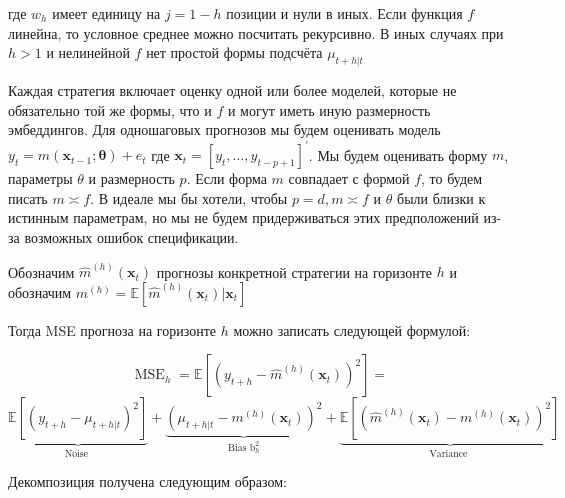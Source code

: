 \documentclass[a4paper,12pt]{article}
\begin{document}
где $ w_h $ имеет единицу на $ j = 1 - h $ позиции и нули в иных. Если функция $ f $ линейна, то условное среднее можно посчитать рекурсивно. В иных случаях при $ h > 1 $ и нелинейной $ f $ нет простой формы подсчёта $ \mu_{t+h | t} $

Каждая стратегия включает оценку одной или более моделей, которые не обязательно той же формы, что и $ f $ и могут иметь иную размерность эмбеддингов. Для одношаговых прогнозов мы будем оценивать модель $y_{t}=m\left(\boldsymbol{x}_{t-1} ; \boldsymbol{\theta}\right)+e_{t}$ где $\boldsymbol{x}_{t}=\left[y_{t}, \ldots, y_{t-p+1}\right]^{\prime}$. Мы будем оценивать форму $ m $, параметры $ \theta $ и размерность $ p $. Если форма $ m $  совпадает с формой $ f $, то будем писать $ m \asymp f $. В идеале мы бы хотели, чтобы $p=d, m \asymp f$ и $ \theta $ были близки к истинным параметрам, но мы не будем придерживаться этих предположений из-за возможных ошибок спецификации. 

Обозначим $\hat{m}^{(h)}\left(\boldsymbol{x}_{t}\right)$ прогнозы конкретной стратегии на горизонте $ h $ и обозначим $m^{(h)} = \mathbb{E}\left[\hat{m}^{(h)}\left(\boldsymbol{x}_{t}\right) | \boldsymbol{x}_{t}\right] $

Тогда MSE прогноза на горизонте $ h $ можно записать следующей формулой:

\[
\operatorname{MSE}_{h}=\mathbb{E}\left[\left(y_{t+h}-\hat{m}^{(h)}\left(\boldsymbol{x}_{t}\right)\right)^{2}\right] =
\]
\[ \underbrace{\mathbb{E}\left[\left(y_{t+h}-\mu_{t+h | t}\right)^{2}\right]}_{\text {Noise }}+\underbrace{\left(\mu_{t+h | t}-m^{(h)}\left(\boldsymbol{x}_{t}\right)\right)^{2}}_{\text {Bias} \text{ b}_{h}^{2}}+\underbrace{\mathbb{E}\left[\left(\hat{m}^{(h)}\left(\boldsymbol{x}_{t}\right)-m^{(h)}\left(\boldsymbol{x}_{t}\right)\right)^{2}\right]}_{\text {Variance }}
\]

Декомпозиция получена следующим образом:
\end{document}
